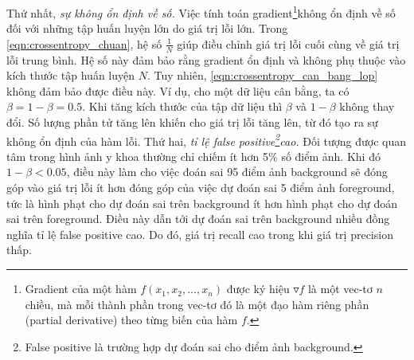 	Thứ nhất, \textit{sự không ổn định về số.} Việc tính toán gradient\footnote{Gradient của một hàm $f(x_1, x_2, ..., x_n)$ được ký hiệu $\triangledown f$ là một vec-tơ $n$ chiều, mà mỗi thành phần trong vec-tơ đó là một đạo hàm riêng phần (partial derivative) theo từng biến của hàm $f$.}không ổn định về số đối với những tập huấn luyện lớn do giá trị lỗi lớn. Trong \autoref{eqn:crossentropy_chuan}, hệ số $\frac{1}{N}$ giúp điều chỉnh giá trị lỗi cuối cùng về giá trị lỗi trung bình. Hệ số này đảm bảo rằng gradient ổn định và không phụ thuộc vào kích thước tập huấn luyện $N$. Tuy nhiên, \autoref{eqn:crossentropy_can_bang_lop} không đảm bảo được điều này. Ví dụ, cho một dữ liệu cân bằng, ta có $\beta = 1 - \beta = 0.5$. Khi tăng kích thước của tập dữ liệu thì $\beta$ và $1 - \beta$ không thay đổi. Số lượng phần tử tăng lên khiến cho giá trị lỗi tăng lên, từ đó tạo ra sự không ổn định của hàm lỗi.
\newpage
	Thứ hai, \textit{tỉ lệ false positive\footnote{False positive là trường hợp dự đoán sai cho điểm ảnh background.}cao.} Đối tượng được quan tâm trong hình ảnh y khoa thường chỉ chiếm ít hơn 5\% số điểm ảnh. Khi đó $1 - \beta < 0.05$, điều này làm cho việc đoán sai 95 điểm ảnh background sẽ đóng góp vào giá trị lỗi ít hơn đóng góp của việc dự đoán sai 5 điểm ảnh foreground, tức là hình phạt cho dự đoán sai trên background ít hơn hình phạt cho dự đoán sai trên foreground. Điều này dẫn tới dự đoán sai trên background nhiều đồng nghĩa tỉ lệ false positive cao. Do đó, giá trị recall cao trong khi giá trị precision thấp.
	
